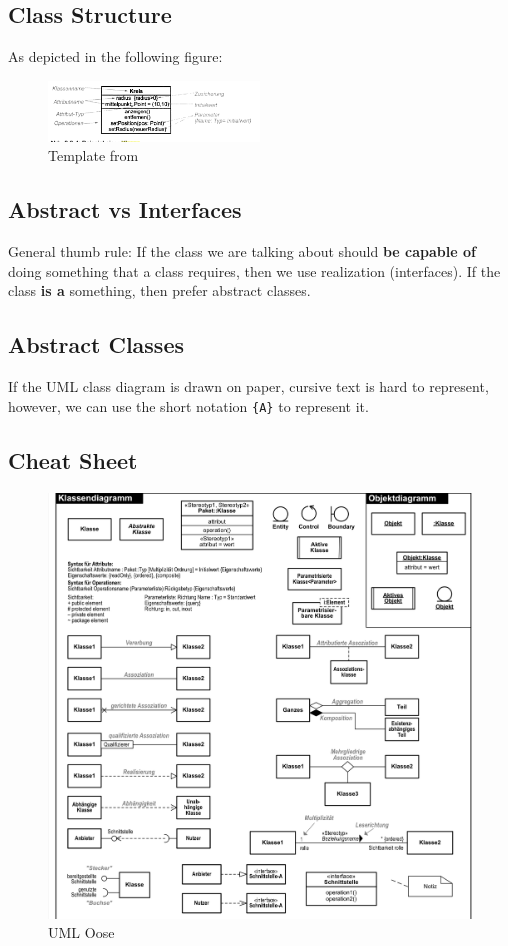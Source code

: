 \documentclass[../main/main.tex]{subfiles}
\begin{document}
\subsection{Class Structure}

As depicted in the following figure:

\begin{figure}[h!]
  \includegraphics[width=0.5\textwidth]{../figures/class.png}
  \caption{Template from \cite{oestereich:kurzreferenz}}
\end{figure}

\subsection{Abstract vs Interfaces}

General thumb rule: If the class we are talking about should \textbf{be capable
of} doing something that a class requires, then we use realization (interfaces).
If the class \textbf{is a} something, then prefer abstract classes. 


\subsection{Abstract Classes}

If the UML class diagram is drawn on paper, cursive text is hard to represent,
however, we can use the short notation \lstinline|{A}| to represent it.  

\subsection{Cheat Sheet}

\begin{figure}
  \includegraphics{../figures/uml_oose.png}  
  \caption{UML Oose \cite{oose:uml} }
  \label{fig:uml_oose}
\end{figure}
\end{document}

